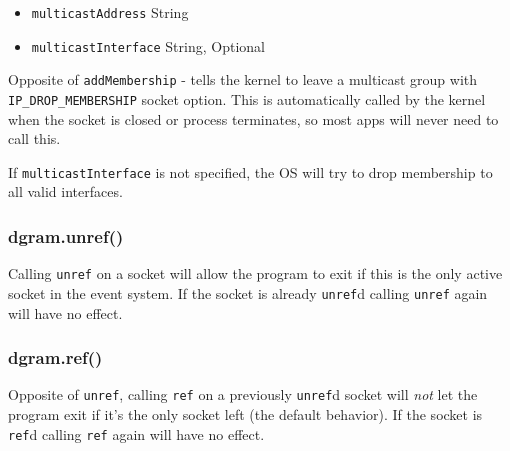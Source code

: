 \begin{itemize}
\item
  \texttt{multicastAddress} String
\item
  \texttt{multicastInterface} String, Optional
\end{itemize}

Opposite of \texttt{addMembership} - tells the kernel to leave a
multicast group with \texttt{IP\_DROP\_MEMBERSHIP} socket option. This
is automatically called by the kernel when the socket is closed or
process terminates, so most apps will never need to call this.

If \texttt{multicastInterface} is not specified, the OS will try to drop
membership to all valid interfaces.

\subsubsection{dgram.unref()}

Calling \texttt{unref} on a socket will allow the program to exit if
this is the only active socket in the event system. If the socket is
already \texttt{unref}d calling \texttt{unref} again will have no
effect.

\subsubsection{dgram.ref()}

Opposite of \texttt{unref}, calling \texttt{ref} on a previously
\texttt{unref}d socket will \emph{not} let the program exit if it's the
only socket left (the default behavior). If the socket is \texttt{ref}d
calling \texttt{ref} again will have no effect.
